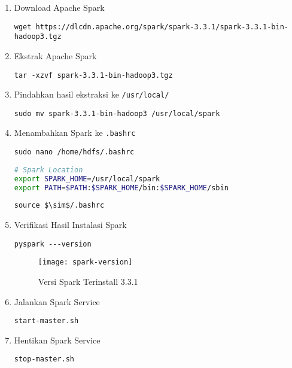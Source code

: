 \documentclass[a4paper]{tufte-handout}
\begin{document}

\begin{enumerate}
\item Download Apache Spark
\begin{lstlisting}[language=Terminal]
 wget https://dlcdn.apache.org/spark/spark-3.3.1/spark-3.3.1-bin-hadoop3.tgz
\end{lstlisting}

\item Ekstrak Apache Spark
\begin{lstlisting}[language=Terminal]
 tar -xzvf spark-3.3.1-bin-hadoop3.tgz
\end{lstlisting}

\item Pindahkan hasil ekstraksi ke {\tt /usr/local/}
\begin{lstlisting}[language=Terminal]
 sudo mv spark-3.3.1-bin-hadoop3 /usr/local/spark
\end{lstlisting} 

\item Menambahkan Spark ke {\tt .bashrc}
\begin{lstlisting}[language=Terminal]
 sudo nano /home/hdfs/.bashrc
\end{lstlisting} 
\begin{lstlisting}[language=Bash, label={lst:bash-spark}, caption=Code Konfig Apaceh Spark]
# Spark Location
export SPARK_HOME=/usr/local/spark
export PATH=$PATH:$SPARK_HOME/bin:$SPARK_HOME/sbin
\end{lstlisting}
\begin{lstlisting}[language=Terminal]
 source $\sim$/.bashrc
\end{lstlisting}

\item Verifikasi Hasil Instalasi Spark
\begin{lstlisting}[language=Terminal]
 pyspark ---version
\end{lstlisting}

\begin{figure}[!ht]
\texttt{[image: spark-version]}
\caption{Versi Spark Terinstall 3.3.1 }
\label{gam:form-ssh}
\end{figure}

\item Jalankan Spark Service
\begin{lstlisting}[language=Terminal]
 start-master.sh
\end{lstlisting}

\item Hentikan Spark Service
\begin{lstlisting}[language=Terminal]
 stop-master.sh
\end{lstlisting} 
\end{enumerate}
\end{document}
